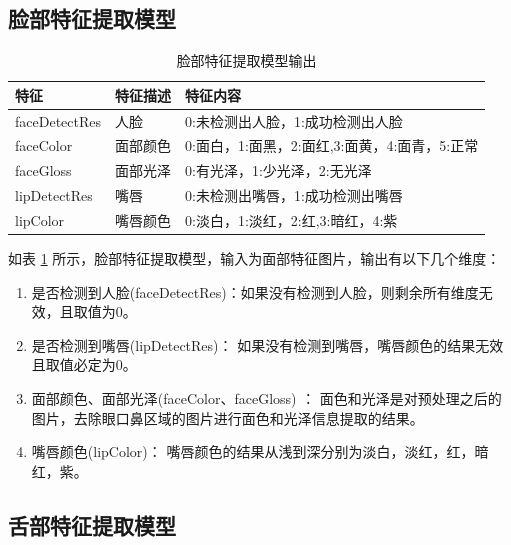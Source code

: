 \subsection{脸部特征提取模型}

\begin{table}[h]
    \centering
    \begin{tabular}{lll}
        \toprule
        特征          & 特征描述     & 特征内容 \\ 
        \midrule
        faceDetectRes & 人脸   & 0:未检测出人脸，1:成功检测出人脸  \\
        faceColor     & 面部颜色 & 0:面白，1:面黑，2:面红,3:面黄，4:面青，5:正常 \\
        faceGloss     & 面部光泽 & 0:有光泽，1:少光泽，2:无光泽\\
        lipDetectRes  & 嘴唇   & 0:未检测出嘴唇，1:成功检测出嘴唇\\
        lipColor      & 嘴唇颜色 & 0:淡白，1:淡红，2:红,3:暗红，4:紫   \\
        \bottomrule
    \end{tabular}
    \caption{脸部特征提取模型输出}
    \label{tab:face-feature}
\end{table}

如表 \ref{tab:face-feature} 所示，脸部特征提取模型，输入为面部特征图片，输出有以下几个维度：

\begin{enumerate}
    \item 是否检测到人脸(faceDetectRes)：如果没有检测到人脸，则剩余所有维度无效，且取值为0。

    \item 是否检测到嘴唇(lipDetectRes)： 如果没有检测到嘴唇，嘴唇颜色的结果无效且取值必定为0。

    \item 面部颜色、面部光泽(faceColor、faceGloss) ： 面色和光泽是对预处理之后的图片，去除眼口鼻区域的图片进行面色和光泽信息提取的结果。

    \item 嘴唇颜色(lipColor)： 嘴唇颜色的结果从浅到深分别为淡白，淡红，红，暗红，紫。
\end{enumerate}


\subsection{舌部特征提取模型}

